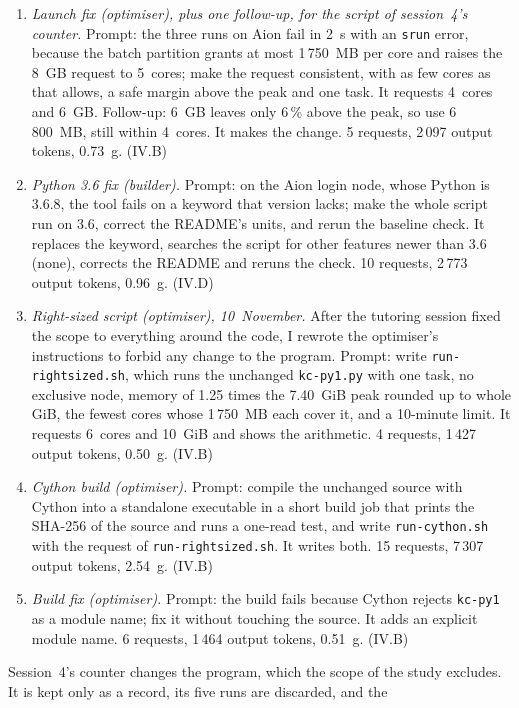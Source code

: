 \documentclass[conference,a4paper]{IEEEtran}
\begin{document}
\begin{enumerate}
  fix. 15 requests, 11\,286 output tokens, 3.92~g. (IV.D)
\item \emph{Launch fix (optimiser), plus one follow-up, for the script of
  session~4's counter.} Prompt: the three
  runs on Aion fail in 2~s with an \texttt{srun} error, because the batch
  partition grants at most 1\,750~MB per core and raises the 8~GB request to
  5~cores; make the request consistent, with as few cores as that allows, a
  safe margin above the peak and one task. It requests 4~cores and 6~GB.
  Follow-up: 6~GB leaves only 6\,\% above the peak, so use 6\,800~MB, still
  within 4~cores. It makes the change. 5 requests, 2\,097 output tokens,
  0.73~g. (IV.B)
\item \emph{Python 3.6 fix (builder).} Prompt: on the Aion login node, whose
  Python is 3.6.8, the tool fails on a keyword that version lacks; make the
  whole script run on 3.6, correct the README's units, and rerun the baseline
  check. It replaces the keyword, searches the script for other features newer
  than 3.6 (none), corrects the README and reruns the check. 10 requests,
  2\,773 output tokens, 0.96~g. (IV.D)
\item \emph{Right-sized script (optimiser), 10~November.} After the tutoring
  session fixed the scope to everything around the code, I rewrote the
  optimiser's instructions to forbid any change to the program. Prompt: write
  \texttt{run-rightsized.sh}, which runs the unchanged \texttt{kc-py1.py} with
  one task, no exclusive node, memory of 1.25 times the 7.40~GiB peak rounded
  up to whole GiB, the fewest cores whose 1\,750~MB each cover it, and a
  10-minute limit. It requests 6~cores and 10~GiB and shows the arithmetic.
  4 requests, 1\,427 output tokens, 0.50~g. (IV.B)
\item \emph{Cython build (optimiser).} Prompt: compile the unchanged source
  with Cython into a standalone executable in a short build job that prints the
  SHA-256 of the source and runs a one-read test, and write
  \texttt{run-cython.sh} with the request of \texttt{run-rightsized.sh}. It
  writes both. 15 requests, 7\,307 output tokens, 2.54~g. (IV.B)
\item \emph{Build fix (optimiser).} Prompt: the build fails because Cython
  rejects \texttt{kc-py1} as a module name; fix it without touching the source.
  It adds an explicit module name. 6 requests, 1\,464 output tokens,
  0.51~g. (IV.B)
\end{enumerate}
Session~4's counter changes the program, which the scope of the study
excludes. It is kept only as a record, its five runs are discarded, and the
\end{document}
